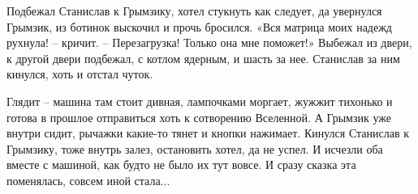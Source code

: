 \documentclass[ebook,oneside,final,openright]{memoir}
\begin{document}
Подбежал Станислав к Грымзику, хотел стукнуть как следует, да увернулся Грымзик, из ботинок выскочил и прочь бросился. «Вся матрица моих надежд рухнула! – кричит. – Перезагрузка! Только она мне поможет!» Выбежал из двери, к другой двери подбежал, с котлом ядерным, и шасть за нее. Станислав за ним кинулся, хоть и отстал чуток.\par
\par
Глядит – машина там стоит дивная, лампочками моргает, жужжит тихонько и готова в прошлое отправиться хоть к сотворению Вселенной. А Грымзик уже внутри сидит, рычажки какие-то тянет и кнопки нажимает. Кинулся Станислав к Грымзику, тоже внутрь залез, остановить хотел, да не успел. И исчезли оба вместе с машиной, как будто не было их тут вовсе. И сразу сказка эта поменялась, совсем иной стала...\par
\end{document}
